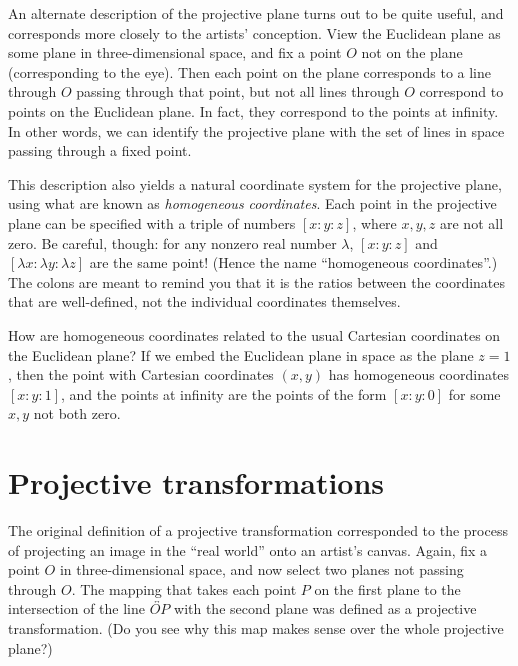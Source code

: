 \documentclass[12pt]{book}
\numberwithin{exc}{section}
\numberwithin{figure}{section}
\numberwithin{equation}{theorem}
\def\line#1{\overleftrightarrow{#1}}
\begin{document}
An alternate description of the projective plane turns out to be 
quite useful, and corresponds more closely to the artists' 
conception. View the Euclidean plane as some plane in 
three-dimensional space, and fix a point $O$ not on the plane 
(corresponding to the eye). Then each point on the plane corresponds 
to a line through $O$ passing through that point, but not all lines 
through $O$ correspond to points on the Euclidean plane. In fact, they 
correspond to the points at infinity. In other words, we can identify 
the projective plane with the set of lines in space passing through a 
fixed point.

This description also yields a natural coordinate system for the 
projective plane, using what are known as \emph{homogeneous 
coordinates}. 
Each point in the projective plane can be specified with 
a triple of numbers $[x:y:z]$, where $x,y,z$ are not all zero. Be 
careful, though: for any nonzero real number $\lambda$, $[x:y:z]$ 
and $[\lambda x: \lambda y: \lambda z]$ are the same point! (Hence 
the name ``homogeneous coordinates''.) The colons are meant to remind 
you that it is the ratios between the coordinates that are 
well-defined, not the individual coordinates themselves.

How are homogeneous coordinates related to the usual Cartesian 
coordinates on the Euclidean plane? If we embed the Euclidean plane 
in space as the plane $z = 1$, then the point with Cartesian 
coordinates $(x,y)$ has homogeneous coordinates $[x:y:1]$, and the 
points at infinity are the points of the form $[x:y:0]$ for some 
$x,y$ not both zero.

\section{Projective transformations}
\label{sec:proj trans}

The original definition of a projective transformation corresponded 
to the process of projecting an image in the ``real world'' onto an 
artist's canvas. Again, fix a point $O$ in three-dimensional space, 
and now select two planes not passing through $O$. The mapping that 
takes each point $P$ on the first plane to the intersection of the 
line $\line{OP}$ with the second plane was defined as a projective 
transformation. (Do you see why this map makes sense over the whole 
projective plane?)
\end{document}

